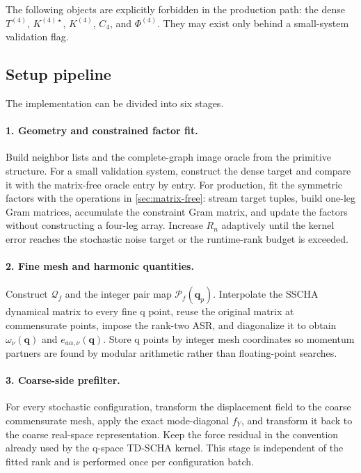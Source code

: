 \documentclass{article}
\begin{document}
The following objects are explicitly forbidden in the production path:
the dense $T^{(4)}$, $K^{(4)\star}$, $K^{(4)}$, $C_4$, and
$\Phi^{(4)}$. They may exist only behind a small-system validation flag.

\subsection{Setup pipeline}
\label{sec:setup-pipeline}

The implementation can be divided into six stages.

\paragraph{1. Geometry and constrained factor fit.}
Build neighbor lists and the complete-graph image oracle from the primitive
structure. For a small validation system, construct the dense target and
compare it with the matrix-free oracle entry by entry. For production, fit
the symmetric factors with the operations in \autoref{sec:matrix-free}:
stream target tuples, build one-leg Gram matrices, accumulate the constraint
Gram matrix, and update the factors without constructing a four-leg array.
Increase $R_n$ adaptively until the kernel error reaches the stochastic
noise target or the runtime-rank budget is exceeded.

\paragraph{2. Fine mesh and harmonic quantities.}
Construct $\mathcal Q_f$ and the integer pair map
$\mathcal P_f(\bm q_p)$. Interpolate the SSCHA dynamical matrix to every
fine q point, reuse the original matrix at commensurate points, impose the
rank-two ASR, and diagonalize it to obtain
$\omega_\nu(\bm q)$ and $e_{a\alpha,\nu}(\bm q)$. Store q points by integer
mesh coordinates so momentum partners are found by modular arithmetic
rather than floating-point searches.

\paragraph{3. Coarse-side prefilter.}
For every stochastic configuration, transform the displacement field to
the coarse commensurate mesh, apply the exact mode-diagonal $f_Y$, and
transform it back to the coarse real-space representation. Keep the force
residual in the convention already used by the q-space TD-SCHA kernel.
This stage is independent of the fitted rank and is performed once per
configuration batch.
\end{document}
